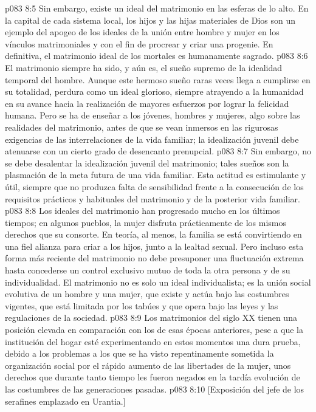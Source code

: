 \vs p083 8:5 Sin embargo, existe un ideal del matrimonio en las esferas de lo alto. En la capital de cada sistema local, los hijos y las hijas materiales de Dios son un ejemplo del apogeo de los ideales de la unión entre hombre y mujer en los vínculos matrimoniales y con el fin de procrear y criar una progenie. En definitiva, el matrimonio ideal de los mortales es humanamente sagrado.
\vs p083 8:6 \pc El matrimonio siempre ha sido, y aún es, el sueño supremo de la idealidad temporal del hombre. Aunque este hermoso sueño raras veces llega a cumplirse en su totalidad, perdura como un ideal glorioso, siempre atrayendo a la humanidad en su avance hacia la realización de mayores esfuerzos por lograr la felicidad humana. Pero se ha de enseñar a los jóvenes, hombres y mujeres, algo sobre las realidades del matrimonio, antes de que se vean inmersos en las rigurosas exigencias de las interrelaciones de la vida familiar; la idealización juvenil debe atenuarse con un cierto grado de desencanto prenupcial.
\vs p083 8:7 Sin embargo, no se debe desalentar la idealización juvenil del matrimonio; tales sueños son la plasmación de la meta futura de una vida familiar. Esta actitud es estimulante y útil, siempre que no produzca falta de sensibilidad frente a la consecución de los requisitos prácticos y habituales del matrimonio y de la posterior vida familiar.
\vs p083 8:8 Los ideales del matrimonio han progresado mucho en los últimos tiempos; en algunos pueblos, la mujer disfruta prácticamente de los mismos derechos que su consorte. En teoría, al menos, la familia se está convirtiendo en una fiel alianza para criar a los hijos, junto a la lealtad sexual. Pero incluso esta forma más reciente del matrimonio no debe presuponer una fluctuación extrema hasta concederse un control exclusivo mutuo de toda la otra persona y de su individualidad. El matrimonio no es solo un ideal individualista; es la unión social evolutiva de un hombre y una mujer, que existe y actúa bajo las costumbres vigentes, que está limitada por los tabúes y que opera bajo las leyes y las regulaciones de la sociedad.
\vs p083 8:9 Los matrimonios del siglo XX tienen una posición elevada en comparación con los de esas épocas anteriores, pese a que la institución del hogar esté experimentando en estos momentos una dura prueba, debido a los problemas a los que se ha visto repentinamente sometida la organización social por el rápido aumento de las libertades de la mujer, unos derechos que durante tanto tiempo les fueron negados en la tardía evolución de las costumbres de las generaciones pasadas.
\vsetoff
\vs p083 8:10 [Exposición del jefe de los serafines emplazado en Urantia.]
